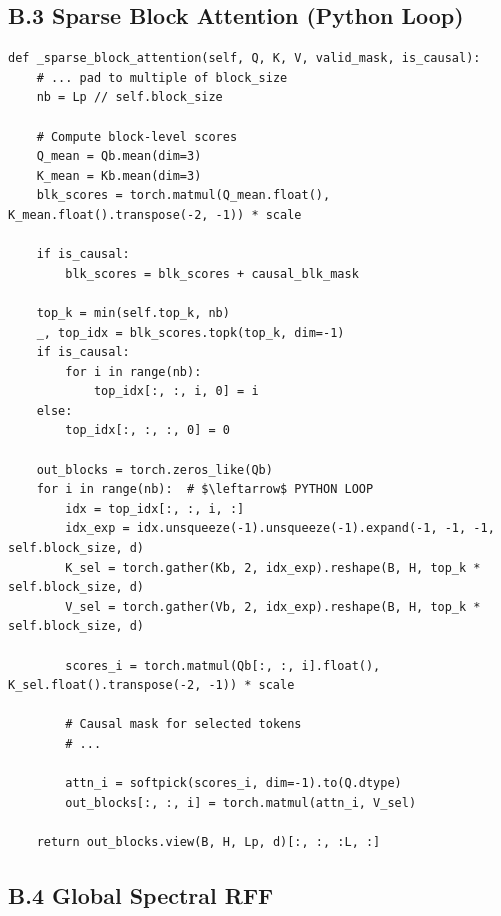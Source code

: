 \subsection{B.3 Sparse Block Attention (Python Loop)}

\begin{lstlisting}
def _sparse_block_attention(self, Q, K, V, valid_mask, is_causal):
    # ... pad to multiple of block_size
    nb = Lp // self.block_size
    
    # Compute block-level scores
    Q_mean = Qb.mean(dim=3)
    K_mean = Kb.mean(dim=3)
    blk_scores = torch.matmul(Q_mean.float(), K_mean.float().transpose(-2, -1)) * scale
    
    if is_causal:
        blk_scores = blk_scores + causal_blk_mask
    
    top_k = min(self.top_k, nb)
    _, top_idx = blk_scores.topk(top_k, dim=-1)
    if is_causal:
        for i in range(nb):
            top_idx[:, :, i, 0] = i
    else:
        top_idx[:, :, :, 0] = 0
    
    out_blocks = torch.zeros_like(Qb)
    for i in range(nb):  # $\leftarrow$ PYTHON LOOP
        idx = top_idx[:, :, i, :]
        idx_exp = idx.unsqueeze(-1).unsqueeze(-1).expand(-1, -1, -1, self.block_size, d)
        K_sel = torch.gather(Kb, 2, idx_exp).reshape(B, H, top_k * self.block_size, d)
        V_sel = torch.gather(Vb, 2, idx_exp).reshape(B, H, top_k * self.block_size, d)
        
        scores_i = torch.matmul(Qb[:, :, i].float(), K_sel.float().transpose(-2, -1)) * scale
        
        # Causal mask for selected tokens
        # ... 
        
        attn_i = softpick(scores_i, dim=-1).to(Q.dtype)
        out_blocks[:, :, i] = torch.matmul(attn_i, V_sel)
    
    return out_blocks.view(B, H, Lp, d)[:, :, :L, :]
\end{lstlisting}

\subsection{B.4 Global Spectral RFF}

